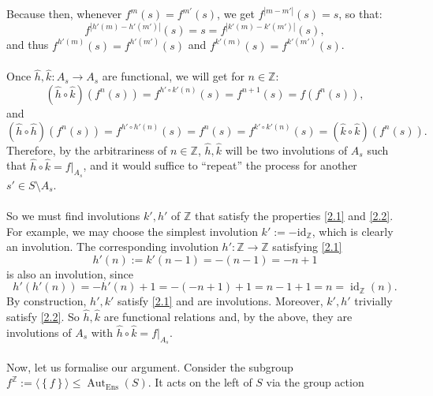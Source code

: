 \begin{solution}
    Because then, whenever \( f^m\left(s\right) = f^{m'}\left(s\right) \), we get \( f^{\left| m - m' \right|}\left(s\right) = s \), so that:
    \[
        f^{\left| h'\left(m\right) - h'\left(m'\right) \right|}\left(s\right) = s = f^{\left| k'\left(m\right) - k'\left(m'\right) \right|}\left(s\right),
    \]
    and thus \( f^{h'\left(m\right)}\left(s\right) = f^{h'\left(m'\right)}\left(s\right) \) and \( f^{k'\left(m\right)}\left(s\right) = f^{k'\left(m'\right)}\left(s\right) \).
    \\\\
    Once \( \hat{h}, \hat{k} : A_s \rightarrow A_s \) are functional, we will get for \( n \in \mathbb{Z} \):
    \[
        \left(\hat{h} \circ \hat{k}\right)\left(f^n\left(s\right)\right) = f^{h'\circ k'\left(n\right)}\left(s\right) = f^{n+1}\left(s\right) = f\left(f^n\left(s\right)\right),
    \]
    and
    \[
        \left(\hat{h} \circ \hat{h}\right)\left(f^n\left(s\right)\right) = f^{h'\circ h'\left(n\right)}\left(s\right) = f^n\left(s\right) = f^{k'\circ k'\left(n\right)}\left(s\right) = \left(\hat{k} \circ \hat{k}\right)\left(f^n\left(s\right)\right).
    \]
    Therefore, by the arbitrariness of \( n \in \mathbb{Z} \), \( \hat{h},\hat{k} \) will be two involutions of \( A_s \) such that \( \hat{h} \circ \hat{k} = f|_{A_s} \), and it would suffice to ``repeat'' the process for another \( s' \in S \setminus A_s \).
    \\\\
    So we must find involutions \( k', h' \) of \( \mathbb{Z} \) that satisfy the properties \eqref{2.1} and \eqref{2.2}. For example, we may choose the simplest involution \( k':=-\mathrm{id}_{\mathbb{Z}} \), which is clearly an involution. The corresponding involution \( h': \mathbb{Z} \rightarrow \mathbb{Z} \) satisfying \eqref{2.1}
    \[
        h'\left(n\right) := k'\left(n - 1\right) = -\left(n - 1\right) = -n + 1
    \]
    is also an involution, since
    \[
        h'\left(h'\left(n\right)\right) = -h'\left(n\right) + 1 = -\left(-n + 1\right) + 1 = n - 1 + 1 = n = \operatorname{id}_{\mathbb{Z}}\left(n\right).
    \]
    By construction, \( h', k' \) satisfy \eqref{2.1} and are involutions. Moreover, \( k', h' \) trivially satisfy \eqref{2.2}. So \( \hat{h}, \hat{k} \) are functional relations and, by the above, they are involutions of \( A_s \) with \( \hat{h} \circ \hat{k} = f|_{A_s} \).
    \\\\
    Now, let us formalise our argument. Consider the subgroup \( f^{\mathbb{Z}} := \langle \left\{f\right\} \rangle \leq \operatorname{Aut}_{\mathrm{Ens}}\left(S\right) \). It acts on the left of \( S \) via the group action

\end{solution}
